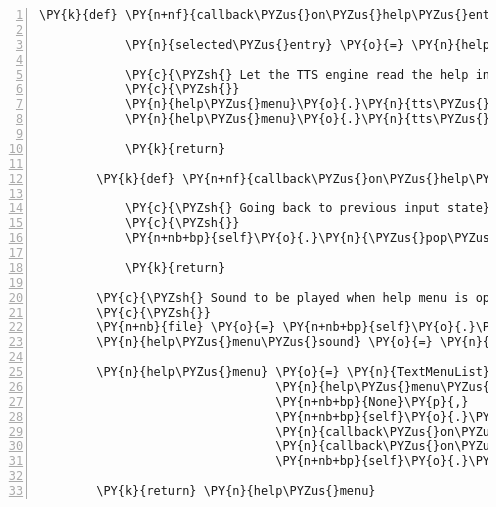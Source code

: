 \begin{Verbatim}[commandchars=\\\{\},numbers=left,firstnumber=1,stepnumber=1]
        \PY{k}{def} \PY{n+nf}{callback\PYZus{}on\PYZus{}help\PYZus{}entry\PYZus{}selected}\PY{p}{(}\PY{n}{help\PYZus{}menu}\PY{p}{)}\PY{p}{:}

            \PY{n}{selected\PYZus{}entry} \PY{o}{=} \PY{n}{help\PYZus{}menu}\PY{o}{.}\PY{n}{list}\PY{p}{[}\PY{n}{help\PYZus{}menu}\PY{o}{.}\PY{n}{list\PYZus{}index}\PY{p}{]}

            \PY{c}{\PYZsh{} Let the TTS engine read the help information at current index}
            \PY{c}{\PYZsh{}}
            \PY{n}{help\PYZus{}menu}\PY{o}{.}\PY{n}{tts\PYZus{}engine}\PY{o}{.}\PY{n}{say}\PY{p}{(}\PY{n}{help\PYZus{}menu\PYZus{}entries\PYZus{}values}\PY{p}{[}\PY{n}{selected\PYZus{}entry}\PY{p}{]}\PY{p}{)}
            \PY{n}{help\PYZus{}menu}\PY{o}{.}\PY{n}{tts\PYZus{}engine}\PY{o}{.}\PY{n}{runAndWait}\PY{p}{(}\PY{p}{)}

            \PY{k}{return}

        \PY{k}{def} \PY{n+nf}{callback\PYZus{}on\PYZus{}help\PYZus{}menu\PYZus{}exit}\PY{p}{(}\PY{n}{help\PYZus{}menu}\PY{p}{)}\PY{p}{:}

            \PY{c}{\PYZsh{} Going back to previous input state}
            \PY{c}{\PYZsh{}}
            \PY{n+nb+bp}{self}\PY{o}{.}\PY{n}{\PYZus{}pop\PYZus{}input\PYZus{}state\PYZus{}from\PYZus{}stack}\PY{p}{(}\PY{p}{)}

            \PY{k}{return}

        \PY{c}{\PYZsh{} Sound to be played when help menu is opened}
        \PY{c}{\PYZsh{}}
        \PY{n+nb}{file} \PY{o}{=} \PY{n+nb+bp}{self}\PY{o}{.}\PY{n}{assets}\PY{o}{.}\PY{n}{fetch}\PY{p}{(}\PY{l+s}{\PYZsq{}}\PY{l+s}{help\PYZus{}menu.ogg}\PY{l+s}{\PYZsq{}}\PY{p}{)}
        \PY{n}{help\PYZus{}menu\PYZus{}sound} \PY{o}{=} \PY{n}{pygame}\PY{o}{.}\PY{n}{mixer}\PY{o}{.}\PY{n}{Sound}\PY{p}{(}\PY{n+nb}{file}\PY{p}{)}

        \PY{n}{help\PYZus{}menu} \PY{o}{=} \PY{n}{TextMenuList}\PY{p}{(}\PY{n}{help\PYZus{}menu\PYZus{}entries}\PY{p}{,}
                                 \PY{n}{help\PYZus{}menu\PYZus{}sound}\PY{p}{,}
                                 \PY{n+nb+bp}{None}\PY{p}{,}
                                 \PY{n+nb+bp}{self}\PY{o}{.}\PY{n}{channel\PYZus{}system}\PY{p}{,}
                                 \PY{n}{callback\PYZus{}on\PYZus{}help\PYZus{}entry\PYZus{}selected}\PY{p}{,}
                                 \PY{n}{callback\PYZus{}on\PYZus{}help\PYZus{}menu\PYZus{}exit}\PY{p}{,}
                                 \PY{n+nb+bp}{self}\PY{o}{.}\PY{n}{tts\PYZus{}engine}\PY{p}{)}

        \PY{k}{return} \PY{n}{help\PYZus{}menu}
\end{Verbatim}
